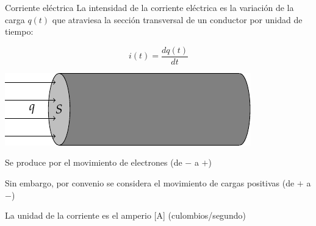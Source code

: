 \documentclass[aspectratio=169, xcolor={usenames,svgnames,dvipsnames}]{beamer}
\begin{document}
\begin{frame}{Corriente eléctrica}
    La \alert{intensidad de la corriente eléctrica} es la variación de la carga \(q(t)\) que atraviesa la sección transversal de un conductor por unidad de tiempo:
    \vspace{7mm}
    
    \begin{minipage}[c]{0.48\linewidth}
    \begin{equation*}
      i(t)=\frac{dq(t)}{dt}
    \end{equation*}
    \end{minipage}
    \hfill
    \begin{minipage}[c]{0.48\linewidth}
    \begin{center}
    \includegraphics[width=0.8\linewidth]{../figs/seccion_conductor.pdf}
    \end{center}
    \end{minipage}
    
    \vspace{7mm}
    Se produce por el \alert{movimiento de electrones} (de $-$ a $+$)
    
    Sin embargo, por convenio se considera el \alert{movimiento de cargas positivas} (de $+$ a $-$)
    
    \vspace{3mm}
    La \alert{unidad} de la corriente es el \alert{amperio} [A] (culombios/segundo)

\end{frame}

\end{document}
